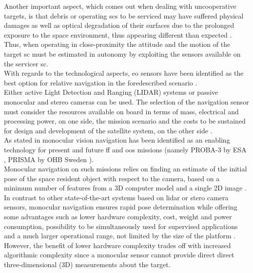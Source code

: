Another important aspect, which comes out when dealing with uncooperative targets, is that debris or operating \acrshort{sc}s to be serviced may have suffered physical damages as well as optical degradation of their surfaces due to the prolonged exposure to the space environment, thus appearing different than expected \cite{Opromolla2017}.\\
Thus, when operating in close-proximity the attitude and the motion of the target \acrshort{sc} must be estimated in autonomy by exploiting the sensors available on the servicer \acrshort{sc}.\\
With regards to the technological aspects, \acrfull{eo} sensors have been identified as the best option for relative navigation in the foredescribed scenario \cite{Opromolla2017} \cite{pesciolino}.\\
Either active Light Detection and Ranging (LIDAR) systems or passive monocular and stereo cameras can be used. The selection of the navigation sensor must consider the resources available on board in terms of mass, electrical and processing power, on one side, the mission scenario and the costs to be sustained for design and development of the satellite system, on the other side \cite{clerc2012astrium} \cite{pesciolino}.\\
As stated in \cite{Sharma2016} monocular vision navigation has been identified as an enabling technology for present and future \acrshort{ff} and \acrshort{oos} missions (namely PROBA-3 by ESA \cite{Casti2019}, PRISMA by OHB Sweden \cite{2013Damico}).\\
Monocular navigation on such missions relies on finding an estimate of the initial pose of the space resident object with respect to the camera, based on a minimum number of features from a 3D computer model and a single 2D image \cite{Sharma2016}.\\
In contrast to other state-of-the-art systems based on \acrfull{lidar} or stero camera sensors, monocular navigation ensures rapid pose determination while offering some advantages such as lower hardware complexity, cost, weight and power consumption, possibility to be simultaneously used for supervised applications and a much larger operational range, not limited by the size of the platform \cite{Sharma2018} \cite{2016Ventura} \cite{pesciolino}.
However, the benefit of lower hardware complexity trades off with increased algorithmic complexity since a monocular sensor cannot provide direct
direct three-dimensional (3D) measurements about the target.\\
